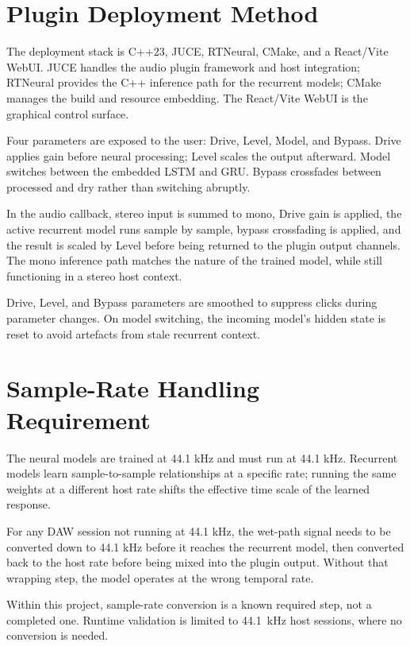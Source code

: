 \section{Plugin Deployment Method}
\label{sec:plugin-deployment-method}

The deployment stack is C++23, JUCE, RTNeural, CMake, and a React/Vite WebUI. JUCE handles the audio plugin framework and host integration; RTNeural provides the C++ inference path for the recurrent models; CMake manages the build and resource embedding. The React/Vite WebUI is the graphical control surface.

Four parameters are exposed to the user: Drive, Level, Model, and Bypass. Drive applies gain before neural processing; Level scales the output afterward. Model switches between the embedded LSTM and GRU. Bypass crossfades between processed and dry rather than switching abruptly.

In the audio callback, stereo input is summed to mono, Drive gain is applied, the active recurrent model runs sample by sample, bypass crossfading is applied, and the result is scaled by Level before being returned to the plugin output channels. The mono inference path matches the nature of the trained model, while still functioning in a stereo host context.

Drive, Level, and Bypass parameters are smoothed to suppress clicks during parameter changes. On model switching, the incoming model's hidden state is reset to avoid artefacts from stale recurrent context.

\section{Sample-Rate Handling Requirement}
\label{sec:sample-rate-handling-requirement}

The neural models are trained at 44.1 kHz and must run at 44.1 kHz. Recurrent models learn sample-to-sample relationships at a specific rate; running the same weights at a different host rate shifts the effective time scale of the learned response.

For any DAW session not running at 44.1 kHz, the wet-path signal needs to be converted down to 44.1 kHz before it reaches the recurrent model, then converted back to the host rate before being mixed into the plugin output. Without that wrapping step, the model operates at the wrong temporal rate.

Within this project, sample-rate conversion is a known required step, not a completed one. Runtime validation is limited to 44.1~kHz host sessions, where no conversion is needed.

